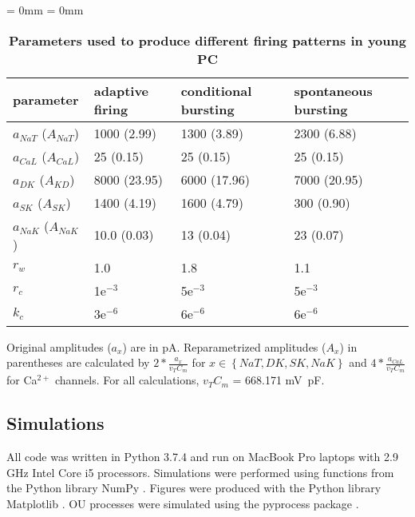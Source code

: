 \documentclass[10pt,letterpaper]{article}
\newcommand{\Ca}{Ca$^{2+}$}
\newcommand{\midsepremove}{\aboverulesep = 0mm \belowrulesep = 0mm}
\begin{document}
\begin{table}[ht!]
\begin{center}
\caption{\textbf{Parameters used to produce different firing patterns in young PC}} 
\begin{footnotesize}
\midsepremove
\begin{tabular}{p{9em} p{9em}  p{9em}  p{9em}} %
\toprule
\textbf{parameter} & \textbf{adaptive \newline firing} & \textbf{conditional \newline bursting} & \textbf{spontaneous bursting} \\
\toprule
$a_{NaT}$ ($A_{NaT}$) & 1000 (2.99) & 1300 (3.89) & 2300 (6.88) \\
$a_{CaL}$ ($A_{CaL}$)& 25 (0.15) & 25 (0.15) & 25 (0.15) \\
$a_{DK}$ ($A_{KD}$)& 8000 (23.95) & 6000 (17.96) & 7000 (20.95) \\
$a_{SK}$ ($A_{SK}$)& 1400 (4.19) & 1600 (4.79) & 300 (0.90) \\
$a_{NaK}$ ($A_{NaK}$)& 10.0 (0.03) & 13 (0.04) & 23 (0.07) \\
$r_{w}$ & 1.0 & 1.8 & 1.1 \\
$r_{c}$ & 1e$^{-3}$ & 5e$^{-3}$ & 5e$^{-3}$ \\
$k_{c}$ & 3e$^{-6}$ & 6e$^{-6}$ & 6e$^{-6}$ \\
\bottomrule 
\end{tabular}
\begin{flushleft}
\footnotesize{Original amplitudes ($a_x$) are in pA. Reparametrized amplitudes ($A_x$) in parentheses are calculated by $2*\frac{a_x}{v_T C_m}$ for $x \in \left\{NaT,DK,SK,NaK\right\}$ and $4*\frac{a_{CaL}}{v_T C_m}$ for {\Ca} channels. For all calculations, $v_T C_m$ = 668.171 mV~pF.}
\end{flushleft}
\end{footnotesize}
\label{tab:regimes}
\end{center}
\end{table}

\subsection*{Simulations}
All code was written in Python 3.7.4 and run on MacBook Pro laptops with 2.9 GHz Intel Core i5 processors. Simulations were performed using functions from the Python library NumPy \cite{numpyHarris2020}. Figures were produced with the Python library Matplotlib \cite{hunter2007matplotlib}. OU processes were simulated using the pyprocess package \cite{mondaca200PyProcess}.
\end{document}
